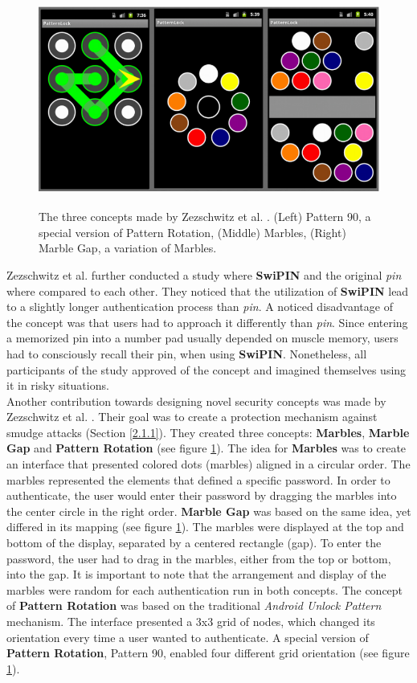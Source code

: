 \begin{figure}[t!]
\centering
\includegraphics[width=13cm, height=7cm]{Chapters/graphics/graphic.PNG}
\caption{The three concepts made by Zezschwitz et al. \cite{Marbles}. (Left) Pattern 90, a special version of Pattern Rotation, (Middle) Marbles, (Right) Marble Gap, a variation of Marbles.}
\label{fig:marbles}
\end{figure}

Zezschwitz et al. \cite{Swipin} further conducted a study where \textbf{SwiPIN} and the original \textit{pin} where compared to each other. They noticed that the utilization of \textbf{SwiPIN} lead to a slightly longer authentication process than \textit{pin}. A noticed disadvantage of the concept was that users had to approach it differently than \textit{pin}. Since entering a memorized pin into a number pad usually depended on muscle memory, users had to consciously recall their pin, when using \textbf{SwiPIN}. Nonetheless, all participants of the study approved of the concept and imagined themselves using it in risky situations. \\

Another contribution towards designing novel security concepts was made by Zezschwitz et al. \cite{Marbles}. Their goal was to create a protection mechanism against smudge attacks (Section \ref{2.1.1}). They created three concepts: \textbf{Marbles}, \textbf{Marble Gap} and \textbf{Pattern Rotation} (see figure \ref{fig:marbles}). The idea for \textbf{Marbles} was to create an interface that presented colored dots (marbles) aligned in a circular order. The marbles represented the elements that defined a specific password. In order to authenticate, the user would enter their password by dragging the marbles into the center circle in the right order. \textbf{Marble Gap} was based on the same idea, yet differed in its mapping (see figure \ref{fig:marbles}). The marbles were displayed at the top and bottom of the display, separated by a centered rectangle (gap). To enter the password, the user had to drag in the marbles, either from the top or bottom, into the gap. It is important to note that the arrangement and display of the marbles were random for each authentication run in both concepts. The concept of \textbf{Pattern Rotation} was based on the traditional \textit{Android Unlock Pattern} mechanism. The interface presented a 3x3 grid of nodes, which changed its orientation every time a user wanted to authenticate. A special version of \textbf{Pattern Rotation}, Pattern 90, enabled four different grid orientation (see figure \ref{fig:marbles}). \\

